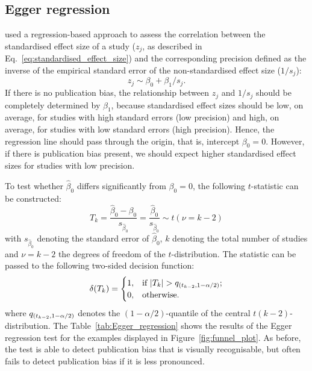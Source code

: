 \subsection{Egger regression}
\citet{egger_bias_1997} used a regression-based approach to assess the correlation between the standardised effect size of a study ($z_j$, as described in Eq.~\ref{eq:standardised_effect_size}) and the corresponding precision defined as the inverse of the empirical standard error of the non-standardised effect size ($1/s_j$):
$$z_j \sim \beta_0 + \beta_1/s_j.$$
If there is no publication bias, the relationship between $z_j$ and $1/s_j$ should be completely determined by $\beta_1$, because standardised effect sizes should be low, on average, for studies with high standard errors (low precision) and high, on average, for studies with low standard errors (high precision). Hence, the regression line should pass through the origin, that is, intercept $\beta_0 = 0$. However, if there is publication bias present, we should expect higher standardised effect sizes for studies with low precision.\par
To test whether $\hat{\beta}_0$ differs significantly from $\beta_0 = 0$, the following $t$-statistic can be constructed:
$$T_k = \frac{\hat{\beta}_0-\beta_0}{s_{\hat{\beta}_0}} = \frac{\hat{\beta}_0}{s_{\hat{\beta}_0}} \sim t(\nu = k-2)$$
with $s_{\hat{\beta}_0}$ denoting the standard error of $\hat{\beta}_0$, $k$ denoting the total number of studies and $\nu = k-2$ the degrees of freedom of the $t$-distribution. The statistic can be passed to the following two-sided decision function: 
\begin{align*}
    \delta(T_k) = \begin{cases} 1, & \text{if } |T_k| > q_{\left( t_{k-2},1-\alpha/2\right)}; \\ 0, & \mbox{otherwise}.\end{cases}
\end{align*}
where $q_{\left( t_{k-2},1-\alpha/2 \right)}$ denotes the $(1-\alpha/2)$-quantile of the central $t(k-2)$-distribution. The Table~\ref{tab:Egger_regression} shows the results of the Egger regression test for the examples displayed in Figure~\ref{fig:funnel_plot}. As before, the test is able to detect publication bias that is visually recognisable, but often fails to detect publication bias if it is less pronounced.
